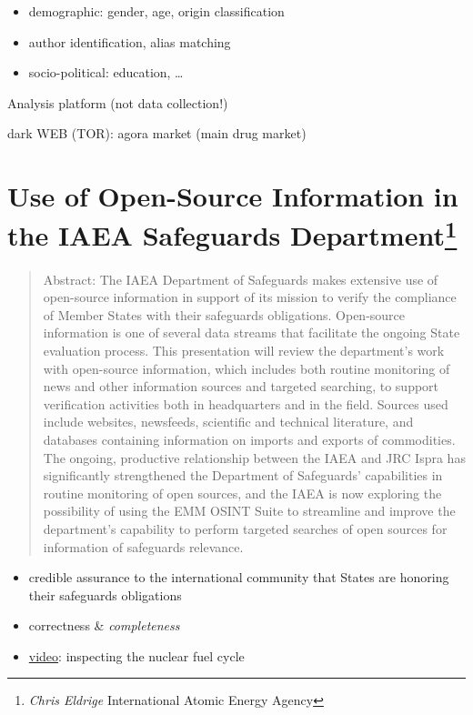 \documentclass[]{book}
\providecommand{\tightlist}{%
  \setlength{\itemsep}{0pt}\setlength{\parskip}{0pt}}
\let\rmarkdownfootnote\footnote%
\def\footnote{\protect\rmarkdownfootnote}
\theoremstyle{definition}
\theoremstyle{definition}
\theoremstyle{definition}
\theoremstyle{remark}
\begin{document}
\begin{itemize}
\tightlist
\item
  demographic: gender, age, origin classification
\item
  author identification, alias matching
\item
  socio-political: education, \ldots{}
\end{itemize}

Analysis platform (not data collection!)

dark WEB (TOR): agora market (main drug market)

\section[Use of Open-Source Information in the IAEA Safeguards
Department]{\texorpdfstring{Use of Open-Source Information in the IAEA
Safeguards Department\footnote{\emph{Chris Eldrige} International Atomic
  Energy Agency}}{Use of Open-Source Information in the IAEA Safeguards Department}}\label{use-of-open-source-information-in-the-iaea-safeguards-department}

\begin{quote}
Abstract: The IAEA Department of Safeguards makes extensive use of
open-source information in support of its mission to verify the
compliance of Member States with their safeguards obligations.
Open-source information is one of several data streams that facilitate
the ongoing State evaluation process. This presentation will review the
department's work with open-source information, which includes both
routine monitoring of news and other information sources and targeted
searching, to support verification activities both in headquarters and
in the field. Sources used include websites, newsfeeds, scientific and
technical literature, and databases containing information on imports
and exports of commodities. The ongoing, productive relationship between
the IAEA and JRC Ispra has significantly strengthened the Department of
Safeguards' capabilities in routine monitoring of open sources, and the
IAEA is now exploring the possibility of using the EMM OSINT Suite to
streamline and improve the department's capability to perform targeted
searches of open sources for information of safeguards relevance.
\end{quote}

\begin{itemize}
\item
  credible assurance to the international community that States are
  honoring their safeguards obligations
\item
  correctness \& \emph{completeness}
\item
  \href{https://goo.gl/6rVxqt}{video}: inspecting the nuclear fuel cycle
\end{itemize}
\end{document}
